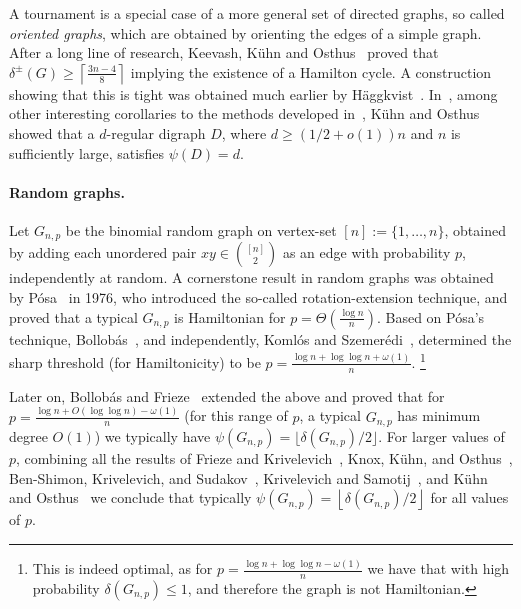\documentclass{article}
\begin{document}
	A tournament is a special case of a more general set of directed graphs, so called \emph{oriented graphs}, which are obtained by orienting the edges of a simple graph.
	After a long line of research, Keevash, K\"uhn and Osthus~\cite{keevash2009exact} proved that $\delta^{\pm}(G) \ge \left\lceil \frac{3n-4}{8} \right\rceil$ implying the existence of a Hamilton cycle. A construction showing that this is tight was obtained much earlier by H\"aggkvist~\cite{haggkvist1993hamilton}.
	In~\cite{kuhn2014applications}, among other interesting corollaries to the methods developed in~\cite{kuhn2013hamilton}, K\"uhn and Osthus showed that a $d$-regular digraph $D$, where $d \ge (1/2+o(1))n$ and $n$ is sufficiently large, satisfies $\psi(D) = d$.
	
	\paragraph*{Random graphs.}
	Let $G_{n,p}$ be the binomial random graph on vertex-set $[n]:=\{1,\ldots,n\}$, obtained by adding each unordered pair $xy\in \binom{[n]}{2}$ as an edge with probability $p$, independently at random. A cornerstone result in random graphs was obtained by P\'{o}sa~\cite{posa} in 1976, who introduced the so-called rotation-extension technique,  and proved that a typical $G_{n,p}$ is Hamiltonian for $p = \Theta\left(\frac{\log n}{n} \right)$. Based on P\'osa's technique, Bollob\'{a}s~\cite{bollobas1984evolution}, and independently, Koml\'{o}s and Szemer\'{e}di~\cite{komlos1983limit}, determined the sharp threshold (for Hamiltonicity) to be $p = \frac{\log n + \log \log n + \omega(1)}{n}$.
	\footnote{This is indeed optimal, as for $p = \frac{\log n +\log \log n - \omega(1)}{n}$ we have that with high probability $\delta\left(G_{n,p} \right) \le 1$, and therefore the graph is not Hamiltonian.}
	
	Later on, Bollob\'{a}s and Frieze~\cite{bollobas1983matchings} extended the above and proved that for $p=\frac{\log n+O(\log\log n)-\omega(1)}{n}$ (for this range of $p$, a typical $G_{n,p}$ has minimum degree $O(1)$) we typically have $\psi\left(G_{n,p} \right) = \lfloor \delta\left(G_{n,p} \right)/2\rfloor$.
	For larger values of $p$, combining all the results of Frieze and Krivelevich~\cites{frieze2005packing,frieze2008two}, Knox, K\"{u}hn, and Osthus~\cites{knox2012approximate,knox2015edge}, Ben-Shimon, Krivelevich, and Sudakov~\cite{ben2011resilience}, Krivelevich and Samotij~\cite{krivelevich2012optimal}, and K\"{u}hn and Osthus~\cite{kuhn2014applications} we conclude that 
	typically $\psi\left(G_{n,p} \right) = \left\lfloor \delta\left(G_{n,p} \right)/2 \right\rfloor$ for all values of $p$. 
	
\end{document}
